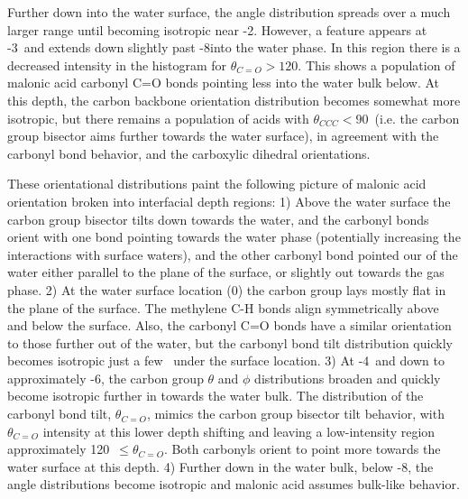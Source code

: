 Further down into the water surface, the angle distribution spreads over a much larger range until becoming isotropic near -2\angs. However, a feature appears at -3\angs~and extends down slightly past -8\angs into the water phase. In this region there is a decreased intensity in the histogram for $\theta_{C=O} > 120$\textdegree. This shows a population of malonic acid carbonyl C=O bonds pointing less into the water bulk below. At this depth, the carbon backbone orientation distribution becomes somewhat more isotropic, but there remains a population of acids with $\theta_{CCC} < 90$\textdegree~(i.e. the carbon group bisector aims further towards the water surface), in agreement with the carbonyl bond behavior, and the carboxylic dihedral orientations.

These orientational distributions paint the following picture of malonic acid orientation broken into interfacial depth regions: 1) Above the water surface the carbon group bisector tilts down towards the water, and the carbonyl bonds orient with one bond pointing towards the water phase (potentially increasing the interactions with surface waters), and the other carbonyl bond pointed our of the water either parallel to the plane of the surface, or slightly out towards the gas phase. 2) At the water surface location (0\angs) the carbon group lays mostly flat in the plane of the surface. The methylene C-H bonds align symmetrically above and below the surface. Also, the carbonyl C=O bonds have a similar orientation to those further out of the water, but the carbonyl bond tilt distribution quickly becomes isotropic just a few \angs~under the surface location. 3) At -4\angs~and down to approximately -6\angs, the carbon group $\theta$ and $\phi$ distributions broaden and quickly become isotropic further in towards the water bulk. The distribution of the carbonyl bond tilt, $\theta_{C=O}$, mimics the carbon group bisector tilt behavior, with $\theta_{C=O}$ intensity at this lower depth shifting and leaving a low-intensity region approximately 120\textdegree~$\le \theta_{C=O}$. Both carbonyls orient to point more towards the water surface at this depth. 4) Further down in the water bulk, below -8\angs, the angle distributions become isotropic and malonic acid assumes bulk-like behavior.
